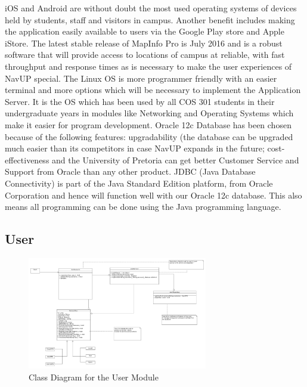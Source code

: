 \documentclass[runningheads,a4paper]{article}
\begin{document}
iOS and Android are without doubt the most used operating systems of devices held by students, staff and visitors in campus. Another benefit includes making the application easily available to users via the Google Play store and Apple iStore. 
The latest stable release of MapInfo Pro is July 2016 and is a robust software that will provide access to locations of campus at reliable, with fast throughput and response times as is necessary to make the user experiences of NavUP special.
The Linux OS is more programmer friendly with an easier terminal and more options which will be necessary to implement the Application Server. It is the OS which has been used by all COS 301 students in their undergraduate years in modules like Networking and Operating Systems which make it easier for program development.
Oracle 12c Database has been chosen because of the following features: upgradability (the database can be upgraded much easier than its competitors in case NavUP expands in the future; cost-effectiveness and the University of Pretoria can get better Customer Service and Support from Oracle than any other product.
JDBC (Java Database Connectivity) is part of the Java Standard Edition platform, from Oracle Corporation and hence will function well with our Oracle 12c database. This also means all programming can be done using the Java programming language.



\subsection {User}

\begin{figure}[H]
   	\centering
   	\includegraphics[width=0.7\textwidth]{User_Class_Diagrams.png}
   	\caption{Class Diagram for the User Module}
\end{figure}
\end{document}
